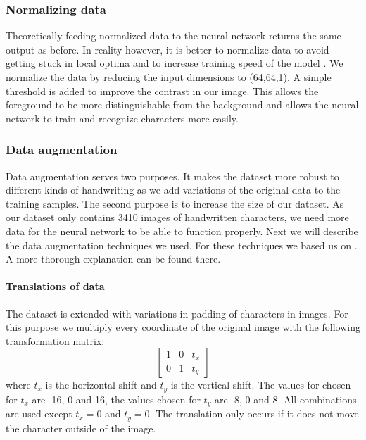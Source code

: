 \documentclass{article}
\begin{document}
\subsubsection{Normalizing data}
\label{par:norm}
Theoretically feeding normalized data to the neural network returns the same output as before.
In reality however, it is better to normalize data to avoid getting stuck in local optima and to increase training speed of the model \cite{NormGoal}.
We normalize the data by reducing the input dimensions to (64,64,1). A simple threshold is added to improve the contrast in our image.
This allows the foreground to be more distinguishable from the background and allows the neural network to train and recognize characters more easily.

\subsubsection{Data augmentation}
\label{par:aug}
Data augmentation serves two purposes. It makes the dataset more robust to different kinds of handwriting as we add variations of the original data to the training samples.
The second purpose is to increase the size of our dataset. As our dataset only contains 3410 images of handwritten characters, we need more data for the neural network to be able to function properly.
Next we will describe the data augmentation techniques we used. For these techniques we based us on \cite{DataAug}. A more thorough explanation can be found there.

\paragraph{Translations of data}
The dataset is extended with variations in padding of characters in images. For this purpose we multiply every coordinate of the original image with the following transformation matrix:
\begin{equation}
        \begin{bmatrix}
                1 & 0 & t_x \\
                0 & 1 & t_y
        \end{bmatrix}
\end{equation}
where $t_x$ is the horizontal shift and $t_y$ is the vertical shift. The values for chosen for $t_x$ are -16, 0 and 16, the values chosen for $t_y$ are -8, 0 and 8. All combinations are used except $t_x=0$ and $t_y=0$. The translation only occurs if it does not move the character outside of the image.
\end{document}
